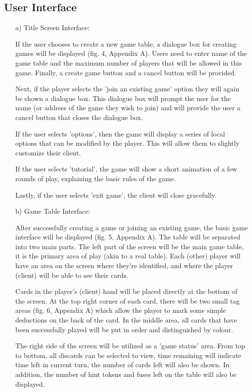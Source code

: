 \documentclass[12pt]{article}
\begin{document}
\subsection{User Interface}
\begin{itemize}



\item[a)] Title Screen Interface:



If the user chooses to create a new game table, a dialogue box for creating games
will be displayed (fig. 4, Appendix A). Users need to enter name of the game table and 
the maximum number of players that will be allowed in this game. Finally,
a create game button and a cancel button will be provided.

Next, if the player selects the 'join an existing game' option they will again
be shown a dialogue box.  This dialogue box will prompt the user for the name (or
address of the game they wish to join) and will provide the user a cancel
button that closes the dialogue box.

If the user selects 'options', then the game will display a series of local
options that can be modified by the player.  This will allow them to slightly
customize their client.

If the user selects 'tutorial', the game will show a short animation of a few
rounds of play, explaining the basic rules of the game.

Lastly, if the user selects 'exit game', the client will close gracefully.

\item[b)] Game Table Interface:

After successfully creating a game or joining an existing game, the basic game
interface will be displayed (fig. 5, Appendix A). The table will be separated into two
main parts. The left part of the screen will be the main game table, it is the
primary area of play (akin to a real table). Each (other) player will have an 
area on the screen where they're identified, and where the player (client) will
be able to see their cards. 

Cards in the player's (client) hand will be placed directly at the bottom of the
screen. At the top right corner of each card, there will be 
two small tag areas (fig. 6, Appendix A) which allow the player to mark some simple deductions
on the back of the card. In the middle area, all cards that have been successfully 
played will be put in order and distinguished by colour. 


The right side of the screen will be utilized as a 'game status' area.
From top to bottom, all discards can be selected to view, 
time remaining will indicate time left in current turn, the number of cards left 
will also be shown. In addition, the number of hint tokens and fuses
left on the table will also be displayed. 

\end{itemize}
\end{document}
